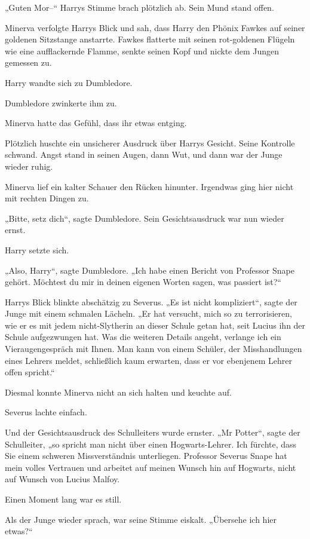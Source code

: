{„Guten Mor--“ Harrys Stimme brach plötzlich ab. Sein Mund stand offen.

Minerva verfolgte Harrys Blick und sah, dass Harry den Phönix Fawkes auf seiner goldenen Sitzstange anstarrte. Fawkes flatterte mit seinen rot-goldenen Flügeln wie eine aufflackernde Flamme, senkte seinen Kopf und nickte dem Jungen gemessen zu.

Harry wandte sich zu Dumbledore.

Dumbledore zwinkerte ihm zu.

Minerva hatte das Gefühl, dass ihr etwas entging.

Plötzlich huschte ein unsicherer Ausdruck über Harrys Gesicht. Seine Kontrolle schwand. Angst stand in seinen Augen, dann Wut, und dann war der Junge wieder ruhig.

Minerva lief ein kalter Schauer den Rücken hinunter. Irgendwas ging hier nicht mit rechten Dingen zu.

„Bitte, setz dich“, sagte Dumbledore. Sein Gesichtsausdruck war nun wieder ernst.

Harry setzte sich.

„Also, Harry“, sagte Dumbledore. „Ich habe einen Bericht von Professor Snape gehört. Möchtest du mir in deinen eigenen Worten sagen, was passiert ist?“

Harrys Blick blinkte abschätzig zu Severus. „Es ist nicht kompliziert“, sagte der Junge mit einem schmalen Lächeln. „Er hat versucht, mich so zu terrorisieren, wie er es mit jedem nicht-Slytherin an dieser Schule getan hat, seit Lucius ihn der Schule aufgezwungen hat. Was die weiteren Details angeht, verlange ich ein Vieraugengespräch mit Ihnen. Man kann von einem Schüler, der Misshandlungen eines Lehrers meldet, schließlich kaum erwarten, dass er vor ebenjenem Lehrer offen spricht.“

Diesmal konnte Minerva nicht an sich halten und keuchte auf.

Severus lachte einfach.

Und der Gesichtsausdruck des Schulleiters wurde ernster. „Mr Potter“, sagte der Schulleiter, „so spricht man nicht über einen Hogwarts-Lehrer. Ich fürchte, dass Sie einem schweren Missverständnis unterliegen. Professor Severus Snape hat mein volles Vertrauen und arbeitet auf meinen Wunsch hin auf Hogwarts, nicht auf Wunsch von Lucius Malfoy.

Einen Moment lang war es still.

Als der Junge wieder sprach, war seine Stimme eiskalt. „Übersehe ich hier etwas?“

}
